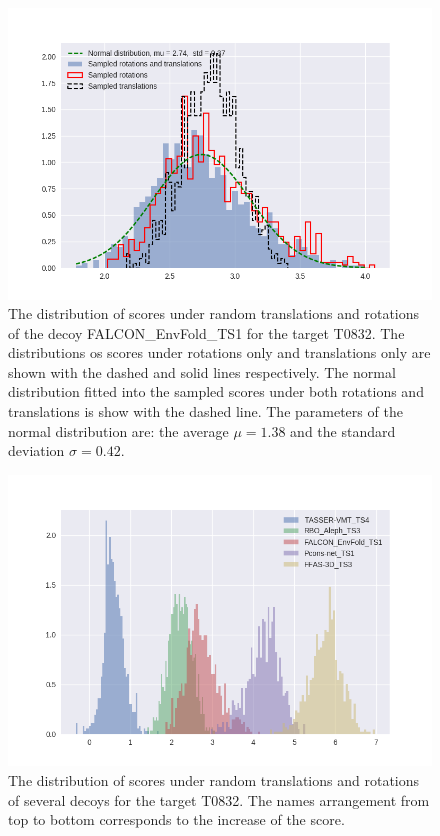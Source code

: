\documentclass[a4paper,10pt]{article}
\begin{document}
\begin{figure}[H]
    \centering
    \includegraphics[width=\linewidth]{Fig/sampling_dist.png}
    \caption{The distribution of scores under random translations and rotations of the decoy 
    FALCON\_EnvFold\_TS1 for the target T0832. The distributions 
    os scores under rotations only and translations only are shown with the dashed and solid lines respectively.
    The normal distribution fitted into the sampled scores under both rotations and translations is show with the dashed line. 
    The parameters of the normal distribution are: the average $\mu = 1.38$ and the standard deviation $\sigma = 0.42$.}
    \label{Fig:ScoreDistribution}
\end{figure}

\begin{figure}[H]
    \centering
    \includegraphics[width=\linewidth]{Fig/decoys_sampling_dist.png}
    \caption{The distribution of scores under random translations and rotations of several decoys for the target T0832. The 
    names arrangement from top to bottom corresponds to the increase of the score.}
    \label{Fig:DecoysScoreDistribution}
\end{figure}
\end{document}
